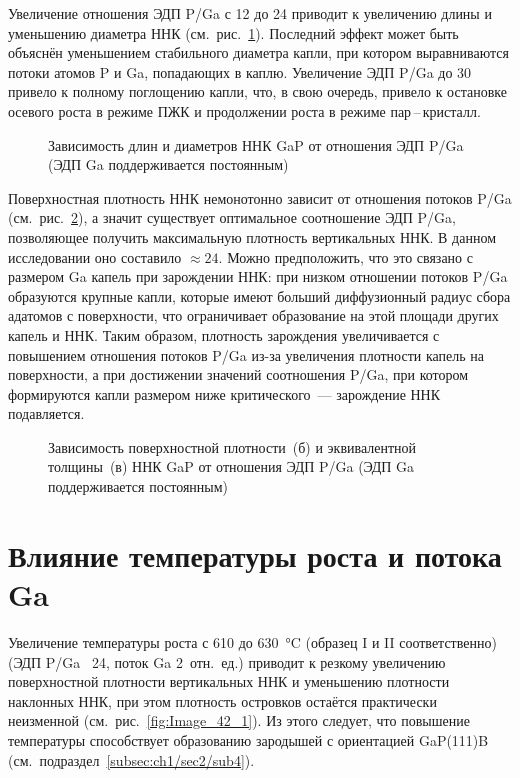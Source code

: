 Увеличение отношения ЭДП P/Ga с 12 до 24 приводит к увеличению длины и
уменьшению диаметра ННК (см.~рис.~\cref{fig:Image_41_1}). Последний эффект
может быть объяснён уменьшением стабильного диаметра капли, при котором
выравниваются потоки атомов P и Ga, попадающих в каплю. Увеличение ЭДП P/Ga до
30 привело к полному поглощению капли, что, в свою очередь, привело к остановке
осевого роста в режиме ПЖК и продолжении роста в режиме пар\,--\,кристалл.

\begin{figure}[ht]  \caption{Зависимость длин и
		диаметров ННК GaP от отношения ЭДП P/Ga (ЭДП Ga поддерживается
постоянным)}\label{fig:Image_41_1} \end{figure}

Поверхностная плотность ННК немонотонно зависит от отношения потоков P/Ga
(см.~рис.~\cref{fig:Image_41_23}), а значит существует оптимальное соотношение
ЭДП P/Ga, позволяющее получить максимальную плотность вертикальных ННК. В
данном исследовании оно составило \(\approx 24\). Можно предположить, что это
связано с размером Ga капель при зарождении ННК: при низком отношении потоков
P/Ga образуются крупные капли, которые имеют больший диффузионный радиус сбора
адатомов с поверхности, что ограничивает образование на этой площади других
капель и ННК. Таким образом, плотность зарождения увеличивается с повышением
отношения потоков P/Ga из-за увеличения плотности капель на поверхности, а при
достижении значений соотношения P/Ga, при котором формируются капли размером
ниже критического~--- зарождение ННК подавляется.

\begin{figure}[ht] 
	\caption{Зависимость поверхностной плотности~(б) и эквивалентной
		толщины~(в) ННК GaP от отношения ЭДП P/Ga (ЭДП Ga поддерживается
постоянным)}\label{fig:Image_41_23} \end{figure}

\section{Влияние температуры роста и потока Ga}\label{sec:ch5/sec5}

Увеличение температуры роста с 610 до 630~\si{\degreeCelsius} (образец I и II
соответственно) (ЭДП P/Ga ~24, поток Ga 2~отн.~ед.) приводит к резкому
увеличению поверхностной плотности вертикальных ННК и уменьшению плотности
наклонных ННК, при этом плотность островков остаётся практически неизменной
(см.~рис.~\cref{fig:Image_42_1}). Из этого следует, что повышение температуры
способствует образованию зародышей с ориентацией GaP(111)B
(см.~подраздел~\cref{subsec:ch1/sec2/sub4}).

